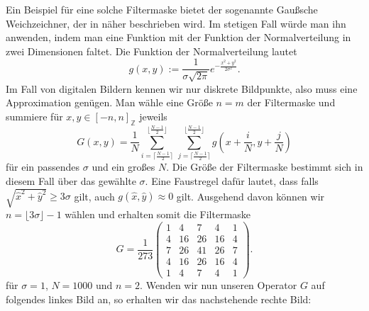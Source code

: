 \documentclass[a4paper, 11pt]{report}
\theoremstyle{definition}
\begin{document}
		Ein Beispiel für eine solche Filtermaske bietet der sogenannte Gaußsche Weichzeichner, der in \cite{gaussianblur} näher beschrieben wird. Im stetigen Fall würde man ihn anwenden, indem man eine Funktion mit der Funktion der Normalverteilung in zwei Dimensionen faltet. Die Funktion der Normalverteilung lautet
		$$ g(x,y) := \frac{1}{\sigma \sqrt{2\pi}} e ^{-\frac{x^2 + y^2}{2\sigma^2}}. $$
		Im Fall von digitalen Bildern kennen wir nur diskrete Bildpunkte, also muss eine Approximation genügen. Man wähle eine Größe $n = m$ der Filtermaske und summiere für $x,y \in [-n, n]_\mathbb{Z}$ jeweils
		$$G(x,y) = \frac{1}{N}\sum_{i=\lceil\frac{N-1}{2}\rceil}^{\lfloor\frac{N-1}{2}\rfloor}\, \sum_{j=\lceil\frac{N-1}{2}\rceil}^{\lfloor\frac{N-1}{2}\rfloor} g(x+\frac{i}{N},y+\frac{j}{N})$$ 
		für ein passendes $\sigma$ und ein großes $N$. Die Größe der Filtermaske bestimmt sich in diesem Fall über das gewählte $\sigma$. Eine Faustregel dafür lautet, dass falls $\sqrt{\hat x^2 + \hat y^2} \geq 3\sigma$ gilt, auch $g(\hat x,\hat y) \approx 0$ gilt. Ausgehend davon können wir $n = \lfloor3\sigma\rfloor-1$ wählen und erhalten somit die Filtermaske
		$$G = \frac{1}{273}
		\begin{pmatrix}
			1&4&7&4&1\\
			4&16&26&16&4\\
			7&26&41&26&7\\
			4&16&26&16&4\\
			1&4&7&4&1
		\end{pmatrix}.$$
 		für $\sigma = 1$, $N = 1000$ und $n = 2$. Wenden wir nun unseren Operator $G$ auf folgendes linkes Bild an, so erhalten wir das nachstehende rechte Bild:
\end{document}
